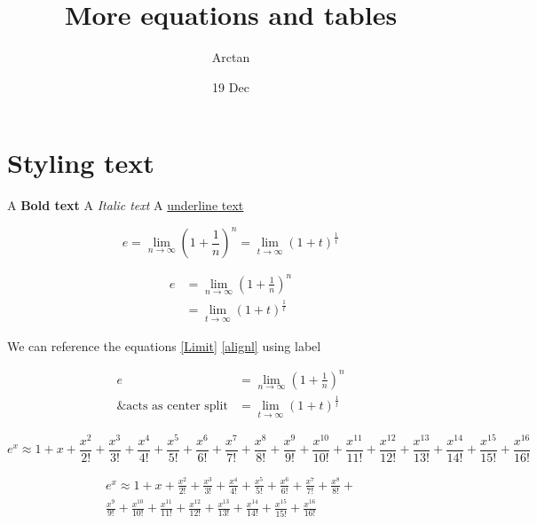 \documentclass{article}
\title{More equations and tables}
\author{Arctan}
\date{19 Dec}
\begin{document}
\maketitle

\section{Styling text}

A \textbf{Bold text}
A \textit{Italic text}
A \underline{underline text}

    \begin{equation}
    \label{Limit}
        e = \lim_{n\to\infty}\left(1+\frac{1}{n}\right)^n
          = \lim_{t\to\infty}(1+t)^\frac{1}{t}
    \end{equation}

    \begin{align}
    \label{alignl}
        e& = \lim_{n\to\infty}\left(1+\frac{1}{n}\right)^n \\ 
          &= \lim_{t\to\infty}(1+t)^\frac{1}{t}
    \end{align}

    We can reference the equations \ref{Limit} \ref{alignl} using label 

    \begin{equation}
    \begin{split}
        e &= \lim_{n\to\infty}\left(1+\frac{1}{n}\right)^n \\
        \text{\& acts as center split}  &= \lim_{t\to\infty}(1+t)^\frac{1}{t}
    \end{split} 
    \end{equation}

    \begin{equation}
        e^x \approx 1 + x + \frac{x^2}{2!} + \frac{x^3}{3!}+ \frac{x^4}{4!}+ \frac{x^5}{5!}+ \frac{x^6}{6!}+ \frac{x^7}{7!}+ \frac{x^8}{8!}+ \frac{x^9}{9!}+ \frac{x^10}{10!}+ \frac{x^11}{11!}+ \frac{x^12}{12!}+ \frac{x^13}{13!}+ \frac{x^14}{14!}+ \frac{x^15}{15!}+ \frac{x^16}{16!}
    \end{equation}

    \begin{multline}
        e^x \approx 1 + x + \frac{x^2}{2!} + \frac{x^3}{3!}+ \frac{x^4}{4!}+ \frac{x^5}{5!}+ \frac{x^6}{6!}+ \frac{x^7}{7!}+ \frac{x^8}{8!}+ \\ \frac{x^9}{9!}+ \frac{x^10}{10!}+ \frac{x^11}{11!}+ \frac{x^12}{12!}+ \frac{x^13}{13!}+ \frac{x^14}{14!}+ \frac{x^15}{15!}+ \frac{x^16}{16!}
    \end{multline}
\end{document}
